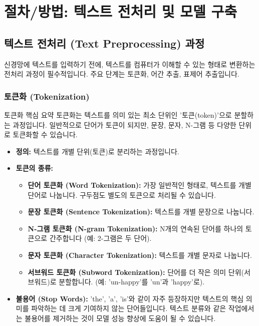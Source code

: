\documentclass[11pt,a4paper]{article}
\begin{document}
\newpage
\section*{절차/방법: 텍스트 전처리 및 모델 구축}

\subsection{텍스트 전처리 (Text Preprocessing) 과정}
신경망에 텍스트를 입력하기 전에, 텍스트를 컴퓨터가 이해할 수 있는 형태로 변환하는 전처리 과정이 필수적입니다. 주요 단계는 토큰화, 어간 추출, 표제어 추출입니다.

\subsubsection{토큰화 (Tokenization)}
\begin{summarybox}{토큰화 핵심 요약}
토큰화는 텍스트를 의미 있는 최소 단위인 '토큰(token)'으로 분할하는 과정입니다. 일반적으로 단어가 토큰이 되지만, 문장, 문자, N-그램 등 다양한 단위로 토큰화할 수 있습니다.
\end{summarybox}

\begin{itemize}
    \item \textbf{정의:} 텍스트를 개별 단위(토큰)로 분리하는 과정입니다.
    \item \textbf{토큰의 종류:}
        \begin{itemize}
            \item \textbf{단어 토큰화 (Word Tokenization):} 가장 일반적인 형태로, 텍스트를 개별 단어로 나눕니다. 구두점도 별도의 토큰으로 처리될 수 있습니다.
            \item \textbf{문장 토큰화 (Sentence Tokenization):} 텍스트를 개별 문장으로 나눕니다.
            \item \textbf{N-그램 토큰화 (N-gram Tokenization):} N개의 연속된 단어를 하나의 토큰으로 간주합니다 (예: 2-그램은 두 단어).
            \item \textbf{문자 토큰화 (Character Tokenization):} 텍스트를 개별 문자로 나눕니다.
            \item \textbf{서브워드 토큰화 (Subword Tokenization):} 단어를 더 작은 의미 단위(서브워드)로 분할합니다. (예: 'un-happy'를 'un'과 'happy'로).
        \end{itemize}
    \item \textbf{불용어 (Stop Words):} 'the', 'a', 'is'와 같이 자주 등장하지만 텍스트의 핵심 의미를 파악하는 데 크게 기여하지 않는 단어들입니다. 텍스트 분류와 같은 작업에서는 불용어를 제거하는 것이 모델 성능 향상에 도움이 될 수 있습니다.
\end{itemize}
\end{document}
